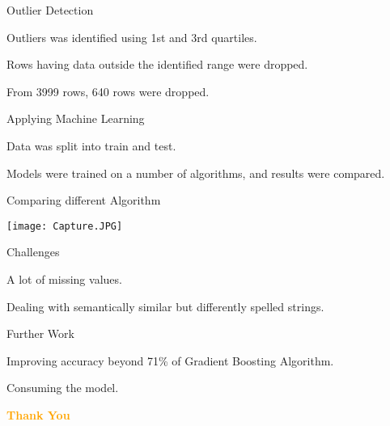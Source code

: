 \documentclass[14pt]{beamer}
\begin{document}
\begin{frame}{Outlier Detection}
\pause
 \begin{fullpageitemize}
  \item\begin{center}Outliers was identified using 1st and 3rd quartiles. \end{center}
  \item\begin{center}Rows having data outside the identified range were dropped.  \end{center}
  \pause
  \item\begin{center}From 3999 rows, 640 rows were dropped.  \end{center}
 \end{fullpageitemize}
\end{frame}
\begin{frame}{Applying Machine Learning}
\pause
 \begin{fullpageitemize}
  \item\begin{center}Data was split into train and test. \end{center}
  \item\begin{center}Models were trained on a number of algorithms, and results were compared.  \end{center}
 \end{fullpageitemize}
\end{frame}
\begin{frame}{Comparing different Algorithm}
\pause
 \begin{fullpageitemize}
  \item \texttt{[image: Capture.JPG]}
 \end{fullpageitemize}
\end{frame}
\begin{frame}{Challenges}
\pause
 \begin{fullpageitemize}
  \item\begin{center} A lot of missing values. \end{center}
  \item\begin{center} Dealing with semantically similar but differently spelled strings. \end{center}
 \end{fullpageitemize}
 \end{frame}
 \begin{frame}{Further Work}
\pause
 \begin{fullpageitemize}
  \item\begin{center} Improving accuracy beyond 71\% of Gradient Boosting Algorithm. \end{center}
  \item\begin{center} Consuming the model. \end{center}
 \end{fullpageitemize}
 \end{frame}
 \begin{frame}{}
 \centering
            \Huge\bfseries
        \textcolor{orange}{Thank You}
\end{frame}
\end{document}
